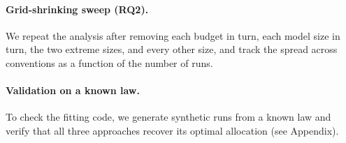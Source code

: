 \paragraph{Grid-shrinking sweep (RQ2).} We repeat the analysis after removing each budget in turn, each model size in turn, the two extreme sizes, and every other size, and track the spread across conventions as a function of the number of runs.

\paragraph{Validation on a known law.} To check the fitting code, we generate synthetic runs from a known law and verify that all three approaches recover its optimal allocation (see Appendix).
